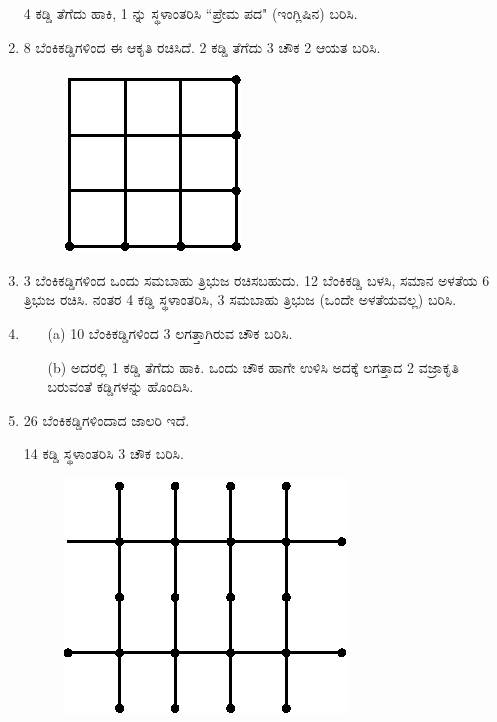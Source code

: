 \begin{enumerate}
4 ಕಡ್ಡಿ ತೆಗೆದು ಹಾಕಿ, 1 ನ್ನು ಸ್ಥಳಾಂತರಿಸಿ ``ಪ್ರೇಮ ಪದ" (ಇಂಗ್ಲಿಷಿನ) ಬರಿಸಿ.  

\item 8 ಬೆಂಕಿಕಡ್ಡಿಗಳಿಂದ ಈ ಆಕೃತಿ ರಚಿಸಿದೆ. 2 ಕಡ್ಡಿ ತೆಗೆದು 3 ಚೌಕ 2 ಆಯತ ಬರಿಸಿ.

\begin{figure}[H]
\centering
\includegraphics{images/chap5/q9.eps}
\end{figure}

\item  3 ಬೆಂಕಿಕಡ್ಡಿಗಳಿಂದ ಒಂದು ಸಮಬಾಹು ತ್ರಿಭುಜ ರಚಿಸಬಹುದು. 12 ಬೆಂಕಿಕಡ್ಡಿ  ಬಳಸಿ, ಸಮಾನ ಅಳತೆಯ 6 ತ್ರಿಭುಜ ರಚಿಸಿ. ನಂತರ 4 ಕಡ್ಡಿ ಸ್ಥಳಾಂತರಿಸಿ, 3 ಸಮಬಾಹು ತ್ರಿಭುಜ (ಒಂದೇ ಅಳತೆಯವಲ್ಲ) ಬರಿಸಿ.

\item 
\begin{itemize}
\item[(a)] 10 ಬೆಂಕಿಕಡ್ಡಿಗಳಿಂದ 3 ಲಗತ್ತಾಗಿರುವ ಚೌಕ ಬರಿಸಿ.
\item[(b)] ಅದರಲ್ಲಿ 1 ಕಡ್ಡಿ ತೆಗೆದು ಹಾಕಿ. ಒಂದು ಚೌಕ ಹಾಗೇ ಉಳಿಸಿ ಅದಕ್ಕೆ ಲಗತ್ತಾದ 2 ವಜ್ರಾಕೃತಿ ಬರುವಂತೆ ಕಡ್ಡಿಗಳನ್ನು ಹೊಂದಿಸಿ.  
\end{itemize}

\item 26 ಬೆಂಕಿಕಡ್ಡಿಗಳಿಂದಾದ ಜಾಲರಿ ಇದೆ. 

14 ಕಡ್ಡಿ ಸ್ಥಳಾಂತರಿಸಿ 3 ಚೌಕ ಬರಿಸಿ. 

\begin{figure}[H]
\centering
\includegraphics[scale=1.1]{images/chap5/q12.eps}
\end{figure}


\end{enumerate}
